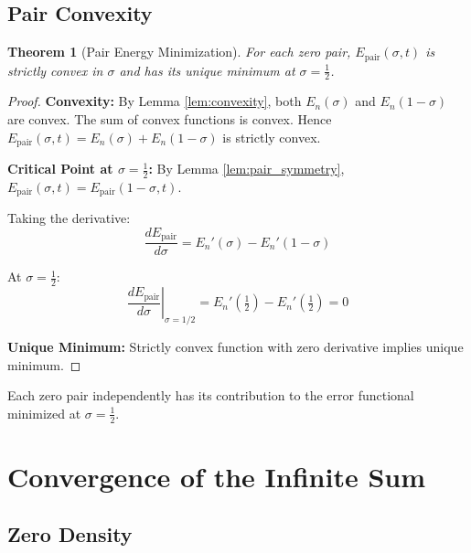 \documentclass[12pt,a4paper]{article}
\newtheorem{theorem}{Theorem}[section]
\theoremstyle{definition}
\theoremstyle{remark}
\newcommand{\Epair}{E_{\text{pair}}}
\newcommand{\half}{\tfrac{1}{2}}
\begin{document}
\subsection{Pair Convexity}

\begin{theorem}[Pair Energy Minimization]
\label{thm:pair_min}
For each zero pair, $\Epair(\sigma, t)$ is strictly convex in $\sigma$ and has its unique minimum at $\sigma = \frac{1}{2}$.
\end{theorem}

\begin{proof}
\textbf{Convexity:} By Lemma \ref{lem:convexity}, both $E_n(\sigma)$ and $E_n(1-\sigma)$ are convex. The sum of convex functions is convex. Hence $\Epair(\sigma, t) = E_n(\sigma) + E_n(1-\sigma)$ is strictly convex.

\textbf{Critical Point at $\sigma = \frac{1}{2}$:} By Lemma \ref{lem:pair_symmetry}, $\Epair(\sigma, t) = \Epair(1-\sigma, t)$.

Taking the derivative:
\begin{equation}
\frac{d\Epair}{d\sigma} = E_n'(\sigma) - E_n'(1-\sigma)
\end{equation}

At $\sigma = \frac{1}{2}$:
\begin{equation}
\left.\frac{d\Epair}{d\sigma}\right|_{\sigma=1/2} = E_n'(\half) - E_n'(\half) = 0
\end{equation}

\textbf{Unique Minimum:} Strictly convex function with zero derivative implies unique minimum.
\end{proof}

\begin{keyresult}
Each zero pair independently has its contribution to the error functional minimized at $\sigma = \frac{1}{2}$.
\end{keyresult}

\section{Convergence of the Infinite Sum}
\label{sec:convergence}

\subsection{Zero Density}
\end{document}
